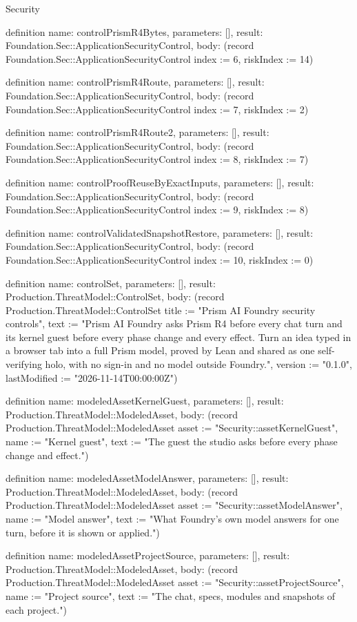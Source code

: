 \begin{lexlean}{Security}
\begin{semanticmodule}
definition{
  name: controlPrismR4Bytes,
  parameters: [],
  result: Foundation.Sec::ApplicationSecurityControl,
  body: (record Foundation.Sec::ApplicationSecurityControl {index := 6, riskIndex := 14})
}

definition{
  name: controlPrismR4Route,
  parameters: [],
  result: Foundation.Sec::ApplicationSecurityControl,
  body: (record Foundation.Sec::ApplicationSecurityControl {index := 7, riskIndex := 2})
}

definition{
  name: controlPrismR4Route2,
  parameters: [],
  result: Foundation.Sec::ApplicationSecurityControl,
  body: (record Foundation.Sec::ApplicationSecurityControl {index := 8, riskIndex := 7})
}

definition{
  name: controlProofReuseByExactInputs,
  parameters: [],
  result: Foundation.Sec::ApplicationSecurityControl,
  body: (record Foundation.Sec::ApplicationSecurityControl {index := 9, riskIndex := 8})
}

definition{
  name: controlValidatedSnapshotRestore,
  parameters: [],
  result: Foundation.Sec::ApplicationSecurityControl,
  body: (record Foundation.Sec::ApplicationSecurityControl {index := 10, riskIndex := 0})
}

definition{
  name: controlSet,
  parameters: [],
  result: Production.ThreatModel::ControlSet,
  body: (record Production.ThreatModel::ControlSet {title := "Prism AI Foundry security controls", text := "Prism AI Foundry asks Prism R4 before every chat turn and its kernel guest before every phase change and every effect. Turn an idea typed in a browser tab into a full Prism model, proved by Lean and shared as one self-verifying holo, with no sign-in and no model outside Foundry.", version := "0.1.0", lastModified := "2026-11-14T00:00:00Z"})
}

definition{
  name: modeledAssetKernelGuest,
  parameters: [],
  result: Production.ThreatModel::ModeledAsset,
  body: (record Production.ThreatModel::ModeledAsset {asset := "Security::assetKernelGuest", name := "Kernel guest", text := "The guest the studio asks before every phase change and effect."})
}

definition{
  name: modeledAssetModelAnswer,
  parameters: [],
  result: Production.ThreatModel::ModeledAsset,
  body: (record Production.ThreatModel::ModeledAsset {asset := "Security::assetModelAnswer", name := "Model answer", text := "What Foundry's own model answers for one turn, before it is shown or applied."})
}

definition{
  name: modeledAssetProjectSource,
  parameters: [],
  result: Production.ThreatModel::ModeledAsset,
  body: (record Production.ThreatModel::ModeledAsset {asset := "Security::assetProjectSource", name := "Project source", text := "The chat, specs, modules and snapshots of each project."})
}


\end{semanticmodule}
\end{lexlean}
